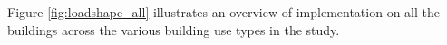 Figure \ref{fig:loadshape_all} illustrates an overview of implementation on all the buildings across the various building use types in the study.